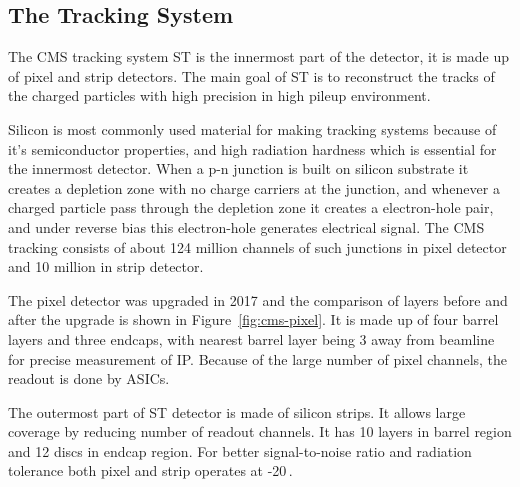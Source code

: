 \subsection{
  The Tracking System
}

The \gls{CMS} tracking system \gls{ST} is the innermost part of the detector, it
is made up of pixel and strip detectors. The main goal of \gls{ST} is to
reconstruct the tracks of the charged particles with high precision in high pileup
environment.

Silicon is most commonly used material for making tracking systems because of it's
semiconductor properties, and high radiation hardness which is essential for the
innermost detector. When a p-n junction is built on silicon substrate it creates
a depletion zone with no charge carriers at the junction, and whenever
a charged particle pass through the depletion zone it creates a electron-hole pair,
and under reverse bias this electron-hole generates electrical signal. The \gls{CMS}
tracking consists of about 124 million channels of such junctions in
pixel detector and 10 million in strip detector.

The pixel detector was upgraded in 2017 and the comparison of layers before
and after the upgrade is shown in Figure~\ref{fig:cms-pixel}. It is made up of
four barrel layers and three endcaps, with nearest barrel layer being 3\cm{}
away from beamline for precise measurement of \gls{IP}.
Because of the large number of pixel channels, the readout is done by \glspl{ASIC}.

The outermost part of \gls{ST} detector is made of silicon strips. It allows large
coverage by reducing number of readout channels. It has 10 layers in barrel region
and 12 discs in endcap region. For better signal-to-noise ratio and radiation
tolerance both pixel and strip operates at -20\,\de{}\xspace.


